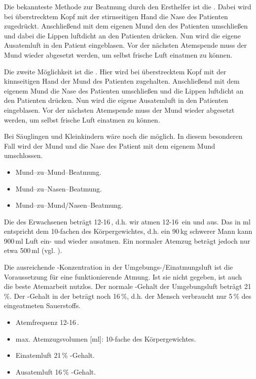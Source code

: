 {
Die bekannteste Methode zur Beatmung durch den Ersthelfer ist die
. Dabei wird bei überstrecktem Kopf mit der stirnseitigen Hand die Nase des Patienten zugedrückt. Anschließend mit dem eigenen Mund den des Patienten umschließen und
dabei die Lippen luftdicht an den Patienten drücken. Nun
wird die eigene Ausatemluft in den Patient eingeblasen. Vor der nächsten Atemspende
muss der Mund wieder abgesetzt werden, um selbst frische Luft einatmen zu
können. 

Die zweite Möglichkeit ist die . Hier wird bei überstrecktem Kopf mit der kinnseitigen Hand der Mund des Patienten
zugehalten. Anschließend mit dem eigenem Mund die Nase des Patienten umschließen und die Lippen luftdicht an den Patienten drücken. Nun wird die eigene
Ausatemluft in den Patienten eingeblasen. Vor der nächsten Atemspende
muss der Mund wieder abgesetzt werden, um selbst frische Luft einatmen zu
können. 

Bei Säuglingen und Kleinkindern wäre noch die
 möglich. In diesem
besonderen Fall wird der Mund und die Nase des Patient mit dem eigenem Mund umschlossen.
}{
\begin{itemize}
  \item Mund--zu--Mund--Beatmung.
  \item Mund--zu--Nasen--Beatmung.
  \item Mund--zu--Mund/Nasen--Beatmung.
\end{itemize}
}{}{}{}

{
Die  des Erwachsenen beträgt 12-16\,, d.h.
wir atmen 12-16\, ein und aus. Das  in ml entspricht dem 10-fachen des Körpergewichtes, d.h. ein
90\,kg schwerer Mann kann 900\,ml Luft ein- und wieder ausatmen. Ein normaler
Atemzug beträgt jedoch nur etwa 500\,ml (vgl. ).

Die ausreichende -Konzentration in der Umgebungs-/Einatmungsluft ist die
Voraussetzung für eine funktionierende Atmung. Ist sie
nicht gegeben, ist auch die beste Atemarbeit nutzlos. Der normale -Gehalt der Umgebungsluft beträgt
21\,\%. Der -Gehalt in der  beträgt
noch 16\,\%, d.h. der Mensch verbraucht  nur 5\,\% des
eingeatmeten Sauerstoffs. 
}{
\begin{itemize}
  \item Atemfrequenz 12-16\,.
  \item max. Atemzugsvolumen [ml]: 10-fache des Körpergewichtes.
  \item Einatemluft 21\,\% -Gehalt.
  \item Ausatemluft 16\,\% -Gehalt.
\end{itemize}
}{}{}{}

